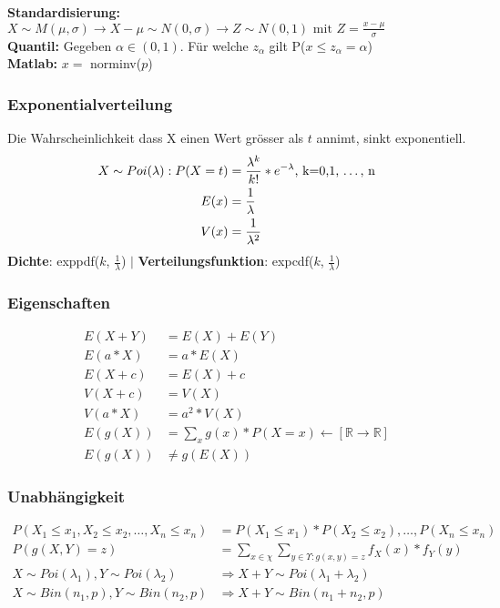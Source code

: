 \documentclass[landscape,twocolumn,a4paper]{article}
\newcommand{\RN}{\mathbb{R}} %
\begin{document}
\textbf{Standardisierung:} $X \sim M(\mu, \sigma) \rightarrow X-\mu \sim N(0,\sigma) \rightarrow Z \sim N(0,1) \text{ mit } Z=\frac{x-\mu}{\sigma}$ \\
\textbf{Quantil:} Gegeben $\alpha \in (0,1)$. Für welche $z_\alpha$ gilt P($x\leq z_\alpha=\alpha$) \\
\textbf{Matlab:} $x=$ norminv($p$)


\subsubsection*{Exponentialverteilung}
Die Wahrscheinlichkeit dass X einen Wert grösser als $t$ annimt, sinkt exponentiell.\\
\begin{align*}
	X \sim Poi(\lambda) : P(X = t) &=\frac{\lambda^k}{k!}*e^{-\lambda} \text{, k=0,1, \dots, n} \\
	E(x) &= \frac{1}{\lambda}\\
	V(x) &= \frac{1}{\lambda^2}
\end{align*} 
\textbf{Dichte}: exppdf($k$, $\frac{1}{\lambda}$) $\mid$ \textbf{Verteilungsfunktion}: expcdf($k$, $\frac{1}{\lambda}$)

\subsubsection*{Eigenschaften}
\begin{align*}
	E(X + Y) &= E(X) + E(Y) \\
	E(a * X) &= a * E(X) \\
	E(X + c) &= E(X) + c\\
	V(X + c) &= V(X) \\
	V(a * X) &= a^2* V(X) \\
	E(g(X)) &= \sum_{x} g(x) * P(X=x) \leftarrow [\RN \rightarrow \RN] \\
	E(g(X)) &\neq g(E(X))
\end{align*} 

\subsubsection*{Unabhängigkeit}
\begin{align*}
P(X_1 \leq x_1, X_2 \leq x_2, \dots, X_n \leq x_n) &= P(X_1 \leq x_1) * P(X_2 \leq x_2), \dots, P(X_n \leq x_n) \\
P(g(X,Y) = z) &= \sum_{x \in \chi} \sum_{y\in \Upsilon:g(x,y)=z} f_X(x) * f_Y(y) \\
X \sim Poi(\lambda_1), Y \sim Poi(\lambda_2) &\Rightarrow X + Y \sim Poi(\lambda_1 + \lambda_2) \\
X \sim Bin(n_1,p), Y \sim Bin(n_2,p) &\Rightarrow X + Y \sim Bin(n_1 + n_2, p)
\end{align*}
\end{document}
